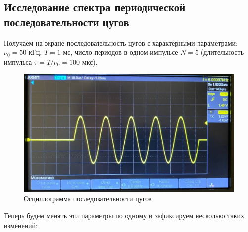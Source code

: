 \documentclass[a4paper, 12pt]{article}%
\begin{document}
	\subsection{Исследование спектра периодической последовательности цугов}
	 Получаем на экране последовательность цугов с характерными параметрами: $\nu_0 = 50$ кГц, $T = 1$ мс, число периодов в одном импульсе $N = 5$ (длительность импульса $\tau = T/\nu_0 = 100$ мкс).
	 \begin{figure}[H]
	 	\centering
	 	\includegraphics[width=0.9\linewidth]{photo_4}
	 	\caption{Осциллограмма последовательности цугов}
	 	\label{fig:photo4}
	 \end{figure}
	 Теперь будем менять эти параметры по одному и зафиксируем несколько таких изменений:
\end{document}
